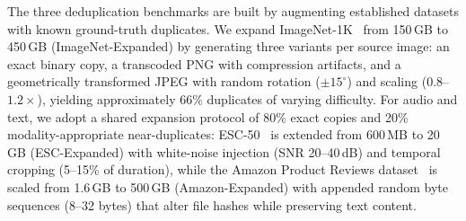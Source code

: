 \documentclass[sigconf, nonacm]{acmart}
\begin{document}
The three deduplication benchmarks are built by augmenting established datasets with known ground-truth duplicates. We expand ImageNet-1K~\cite{russakovsky2015imagenet} from 150\,GB to 450\,GB (ImageNet-Expanded) by generating three variants per source image: an exact binary copy, a transcoded PNG with compression artifacts, and a geometrically transformed JPEG with random rotation ($\pm15^{\circ}$) and scaling ($0.8$--$1.2\times$), yielding approximately 66\% duplicates of varying difficulty. For audio and text, we adopt a shared expansion protocol of 80\% exact copies and 20\% modality-appropriate near-duplicates: ESC-50~\cite{piczak2015esc} is extended from 600\,MB to 20\,GB (ESC-Expanded) with white-noise injection (SNR 20--40\,dB) and temporal cropping (5--15\% of duration), while the Amazon Product Reviews dataset~\cite{ni2019justifying} is scaled from 1.6\,GB to 500\,GB (Amazon-Expanded) with appended random byte sequences (8--32 bytes) that alter file hashes while preserving text content.
\end{document}
